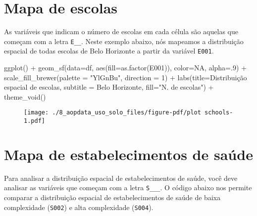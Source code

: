 \documentclass[
  letterpaper,
  DIV=11,
  numbers=noendperiod]{scrreprt}
\newenvironment{Shaded}{\begin{snugshade}}{\end{snugshade}}
\newcommand{\AttributeTok}[1]{\textcolor[rgb]{0.40,0.45,0.13}{#1}}
\newcommand{\ConstantTok}[1]{\textcolor[rgb]{0.56,0.35,0.01}{#1}}
\newcommand{\DecValTok}[1]{\textcolor[rgb]{0.68,0.00,0.00}{#1}}
\newcommand{\FunctionTok}[1]{\textcolor[rgb]{0.28,0.35,0.67}{#1}}
\newcommand{\NormalTok}[1]{\textcolor[rgb]{0.00,0.23,0.31}{#1}}
\newcommand{\SpecialCharTok}[1]{\textcolor[rgb]{0.37,0.37,0.37}{#1}}
\newcommand{\StringTok}[1]{\textcolor[rgb]{0.13,0.47,0.30}{#1}}
\begin{document}
\hypertarget{mapa-de-escolas}{%
\section{Mapa de escolas}\label{mapa-de-escolas}}

As variáveis que indicam o número de escolas em cada célula são aquelas
que começam com a letra \texttt{E\_\_}. Neste exemplo abaixo, nós
mapeamos a distribuição espacial de todas escolas de Belo Horizonte a
partir da variável \texttt{E001}.

\begin{Shaded}
\begin{Highlighting}[]
\FunctionTok{ggplot}\NormalTok{() }\SpecialCharTok{+}
  \FunctionTok{geom\_sf}\NormalTok{(}\AttributeTok{data=}\NormalTok{df, }\FunctionTok{aes}\NormalTok{(}\AttributeTok{fill=}\FunctionTok{as.factor}\NormalTok{(E001)), }\AttributeTok{color=}\ConstantTok{NA}\NormalTok{, }\AttributeTok{alpha=}\NormalTok{.}\DecValTok{9}\NormalTok{) }\SpecialCharTok{+}
   \FunctionTok{scale\_fill\_brewer}\NormalTok{(}\AttributeTok{palette =} \StringTok{"YlGnBu"}\NormalTok{, }\AttributeTok{direction =} \DecValTok{1}\NormalTok{) }\SpecialCharTok{+}
  \FunctionTok{labs}\NormalTok{(}\AttributeTok{title=}\StringTok{\textquotesingle{}Distribuição espacial de escolas\textquotesingle{}}\NormalTok{, }
       \AttributeTok{subtitle =} \StringTok{\textquotesingle{}Belo Horizonte\textquotesingle{}}\NormalTok{, }\AttributeTok{fill=}\StringTok{"N. de escolas"}\NormalTok{) }\SpecialCharTok{+}
  \FunctionTok{theme\_void}\NormalTok{()}
\end{Highlighting}
\end{Shaded}

\begin{figure}[H]

{\centering \texttt{[image: ./8\_aopdata\_uso\_solo\_files/figure-pdf/plot schools-1.pdf]}

}

\end{figure}

\hypertarget{mapa-de-estabelecimentos-de-sauxfade}{%
\section{Mapa de estabelecimentos de
saúde}\label{mapa-de-estabelecimentos-de-sauxfade}}

Para analisar a distribuição espacial de estabelecimentos de saúde, você
deve analisar as variáveis que começam com a letra \texttt{S\_\_\_}. O
código abaixo nos permite comparar a distribuição espacial de
estabelecimentos de saúde de baixa complexidade (\texttt{S002}) e alta
complexidade (\texttt{S004}).
\end{document}
